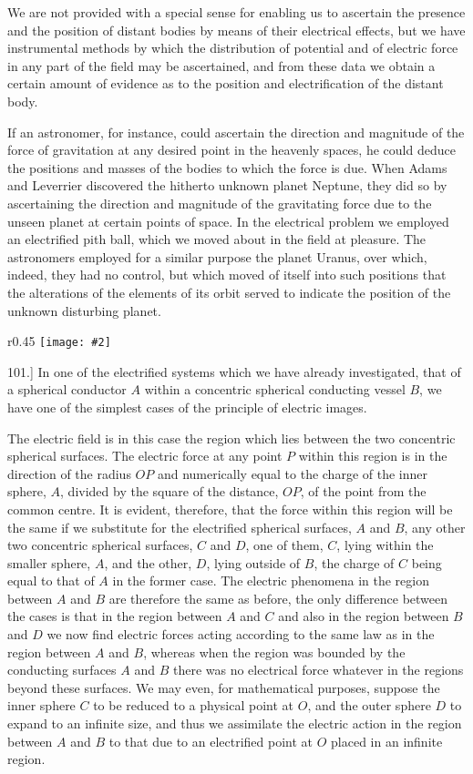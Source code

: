 \documentclass[12pt,oneside]{book}[2021/10/04]
\newcommand{\artlabel}[1]{\phantomsection \label{art:#1}{}}
\newcommand{\wrapfig}[3]{
\begin{wrapfigure}{r}{#1\textwidth}
\centering
\texttt{[image: \#2]}
\caption*{\small #3}
\end{wrapfigure}}
\newcommand{\¬}{\hphantom{0}}
\begin{document}
We are not provided with a special sense for enabling us to
ascertain the presence and the position of distant bodies by means
of their electrical effects, but we have instrumental methods by
which the distribution of potential and of electric force in any part
of the field may be ascertained, and from these data we obtain a
certain amount of evidence as to the position and electrification of
the distant body.

If an astronomer, for instance, could ascertain the direction and
magnitude of the force of gravitation at any desired point in the
heavenly spaces, he could deduce the positions and masses of the
bodies to which the force is due. When Adams and Leverrier
discovered the hitherto unknown planet Neptune, they did so by
ascertaining the direction and magnitude of the gravitating force
due to the unseen planet at certain points of space. In the electrical
problem we employed an electrified pith ball, which we
moved about in the field at pleasure. The astronomers employed
for a similar purpose the planet Uranus, over which, indeed, they
had no control, but which moved of itself into such positions that
the alterations of the elements of its orbit served to indicate the
position of the unknown disturbing planet.

\artlabel{101}
\wrapfig{0.45}{100.png}{Fig. 22.}
101.] In one of the electrified systems which we have already
investigated, that of a spherical conductor \(A\) within a concentric
spherical conducting vessel \(B\), we have one of the simplest cases of
the principle of electric images.

The electric field is in this case the region which lies between
the two concentric spherical surfaces. The electric force at any
point \(P\) within this region is in the direction of the radius \(OP\)
and numerically equal to the charge of the inner sphere, \(A\), divided
by the square of the distance, \(OP\), of the point from the common
centre. It is evident, therefore, that the force within this region
will be the same if we substitute for the electrified spherical surfaces,
\(A\) and \(B\), any other two concentric spherical surfaces, \(C\) and
\(D\), one of them, \(C\), lying within the smaller sphere, \(A\), and the
other, \(D\), lying outside of \(B\), the charge of \(C\) being equal to that
of \(A\) in the former case. The electric phenomena in the region
between \(A\) and \(B\) are therefore the same as before, the only difference
between the cases is that in the region between \(A\) and \(C\) and
also in the region between \(B\) and \(D\) we now find electric forces
acting according to the same law
as in the region between \(A\) and
\(B\), whereas when the region was
bounded by the conducting surfaces
\(A\) and \(B\) there was no electrical
force whatever in the regions
beyond these surfaces. We may
even, for mathematical purposes,
suppose the inner sphere \(C\) to be
reduced to a physical point at \(O\),
and the outer sphere \(D\) to expand
to an infinite size, and thus we
assimilate the electric action in
the region between \(A\) and \(B\) to that due to an electrified point at
\(O\) placed in an infinite region.
\end{document}
